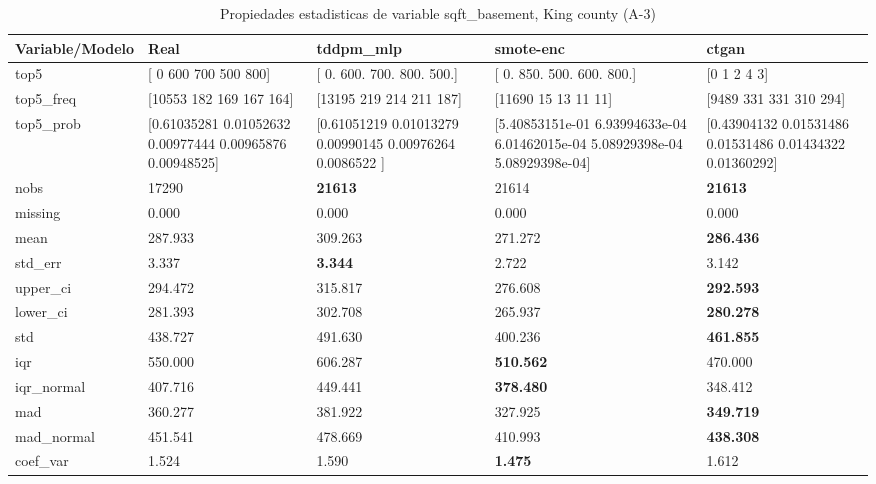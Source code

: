 \begin{table}[H]
\centering
\fontsize{8}{14}\selectfont
\caption{Propiedades  estadisticas de variable sqft\_basement, King county (A-3)}
\label{table-stats-king county-a-3-sqft_basement}
\begin{tabular}{|l|m{10em}|m{10em}|m{10em}|m{10em}|}
\hline
 \rowcolor[gray]{0.8}
Variable/Modelo & Real & tddpm\_mlp & smote-enc & ctgan \\
\hline top5 & [  0 600 700 500 800] & [  0. 600. 700. 800. 500.] & [  0. 850. 500. 600. 800.] & [0 1 2 4 3] \\
\hline top5\_freq & [10553   182   169   167   164] & [13195   219   214   211   187] & [11690    15    13    11    11] & [9489  331  331  310  294] \\
\hline top5\_prob & [0.61035281 0.01052632 0.00977444 0.00965876 0.00948525] & [0.61051219 0.01013279 0.00990145 0.00976264 0.0086522 ] & [5.40853151e-01 6.93994633e-04 6.01462015e-04 5.08929398e-04
 5.08929398e-04] & [0.43904132 0.01531486 0.01531486 0.01434322 0.01360292] \\
\hline nobs & 17290 & \bfseries 21613 & \cellcolor[rgb]{0.9, 0.54, 0.52} 21614 & \bfseries 21613 \\
\hline missing & 0.000 & 0.000 & 0.000 & 0.000 \\
\hline mean & 287.933 & \cellcolor[rgb]{0.9, 0.54, 0.52} 309.263 & 271.272 & \bfseries 286.436 \\
\hline std\_err & 3.337 & \bfseries 3.344 & \cellcolor[rgb]{0.9, 0.54, 0.52} 2.722 & 3.142 \\
\hline upper\_ci & 294.472 & \cellcolor[rgb]{0.9, 0.54, 0.52} 315.817 & 276.608 & \bfseries 292.593 \\
\hline lower\_ci & 281.393 & \cellcolor[rgb]{0.9, 0.54, 0.52} 302.708 & 265.937 & \bfseries 280.278 \\
\hline std & 438.727 & \cellcolor[rgb]{0.9, 0.54, 0.52} 491.630 & 400.236 & \bfseries 461.855 \\
\hline iqr & 550.000 & 606.287 & \bfseries 510.562 & \cellcolor[rgb]{0.9, 0.54, 0.52} 470.000 \\
\hline iqr\_normal & 407.716 & 449.441 & \bfseries 378.480 & \cellcolor[rgb]{0.9, 0.54, 0.52} 348.412 \\
\hline mad & 360.277 & 381.922 & \cellcolor[rgb]{0.9, 0.54, 0.52} 327.925 & \bfseries 349.719 \\
\hline mad\_normal & 451.541 & 478.669 & \cellcolor[rgb]{0.9, 0.54, 0.52} 410.993 & \bfseries 438.308 \\
\hline coef\_var & 1.524 & 1.590 & \bfseries 1.475 & \cellcolor[rgb]{0.9, 0.54, 0.52} 1.612 \\

\end{tabular}
\end{table}

